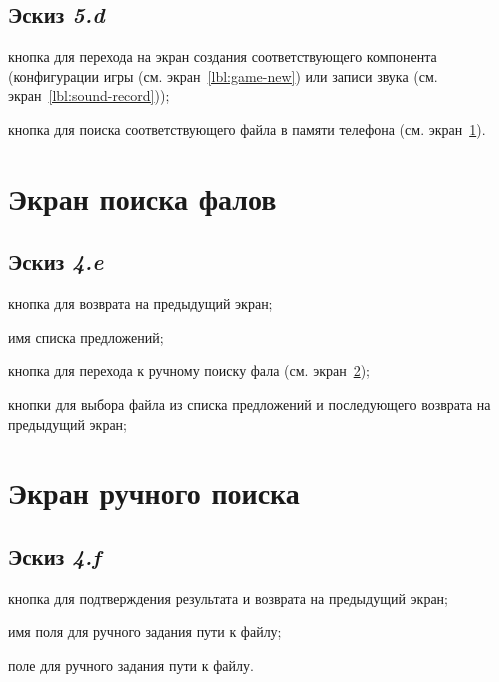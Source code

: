 \subsection{Эскиз \emph{5.d}}

\begin{enumerate*}
    \item кнопка для перехода на экран создания соответствующего компонента (конфигурации игры (см. экран~\ref{lbl:game-new}) или записи звука (см. экран~\ref{lbl:sound-record}));
    \item кнопка для поиска соответствующего файла в памяти телефона (см. экран~\ref{lbl:browse}).
\end{enumerate*}

\section{Экран поиска фалов}\label{lbl:browse}

\subsection{Эскиз \emph{4.e}}

\begin{enumerate*}
    \item кнопка для возврата на предыдущий экран;
    \item имя списка предложений;
    \item кнопка для перехода к ручному поиску фала (см. экран~\ref{lbl:browse-custom});
    \item кнопки для выбора файла из списка предложений и последующего возврата на предыдущий экран;
\end{enumerate*}

\section{Экран ручного поиска}\label{lbl:browse-custom}

\subsection{Эскиз \emph{4.f}}

\begin{enumerate*}
    \item кнопка для подтверждения результата и возврата на предыдущий экран;
    \item имя поля для ручного задания пути к файлу;
    \item поле для ручного задания пути к файлу.
\end{enumerate*}

